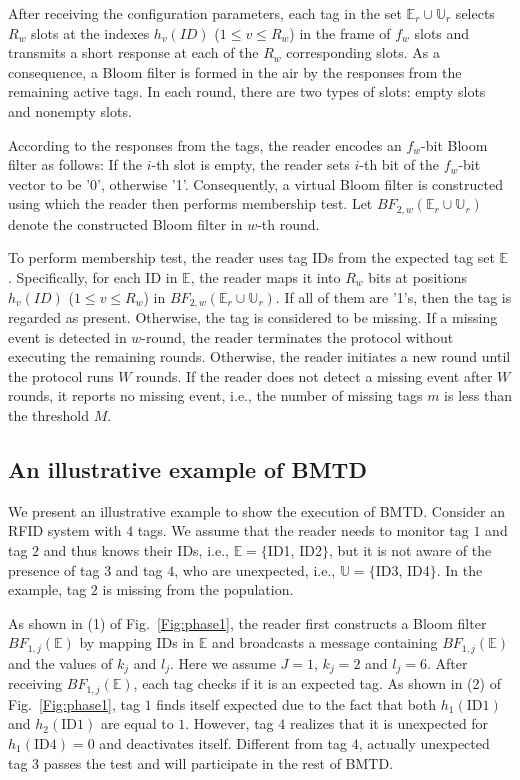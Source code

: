 \documentclass[10pt, twocolumn]{IEEEtran}
\begin{document}
After receiving the configuration parameters, each tag in the set $\mathbb{E}_r \cup \mathbb{U}_{r}$ selects $R_w$ slots at the indexes $h_v(ID)$ ($1 \le v \le R_w$) in the frame of $f_w$ slots and transmits a short response at each of the $R_w$ corresponding slots. As a consequence, a Bloom filter is formed in the air by the responses from the remaining active tags. In each round, there are two types of slots: empty slots and nonempty slots.

According to the responses from the tags, the reader encodes an $f_w$-bit Bloom filter as follows: If the $i$-th slot is empty, the reader sets $i$-th bit of the $f_w$-bit vector to be '0', otherwise '1'. Consequently, a virtual Bloom filter is constructed using which the reader then performs membership test. Let $BF_{2,w}(\mathbb{E}_r \cup \mathbb{U}_{r})$ denote the constructed Bloom filter in $w$-th round.

To perform membership test, the reader uses tag IDs from the expected tag set $\mathbb{E}$. Specifically, for each ID in $\mathbb{E}$, the reader maps it into $R_w$ bits at positions $h_v(ID)$ ($1 \le v \le R_w$) in $BF_{2,w}(\mathbb{E}_r \cup \mathbb{U}_{r})$. If all of them are '1's, then the tag is regarded as present. Otherwise, the tag is considered to be missing. If a missing event is detected in $w$-round, the reader terminates the protocol without executing the remaining rounds. Otherwise, the reader initiates a new round until the protocol runs $W$ rounds. If the reader does not detect a missing event after $W$ rounds, it reports no missing event, i.e., the number of missing tags $m$ is less than the threshold $M$.


\subsection{An illustrative example of BMTD}
We present an illustrative example to show the execution of BMTD. Consider an RFID system with $4$ tags. We assume that the reader needs to monitor tag $1$ and tag $2$ and thus knows their IDs, i.e., $\mathbb{E}$$=$$\{$ID1, ID2$\}$, but it is not aware of the presence of tag $3$ and tag $4$, who are unexpected, i.e., $\mathbb{U}$$=$$\{$ID3, ID4$\}$. In the example, tag $2$ is missing from the population.

As shown in (1) of Fig.~\ref{Fig:phase1}, the reader first constructs a Bloom filter $BF_{1,j} (\mathbb{E})$ by mapping IDs in $\mathbb{E}$ and broadcasts a message containing $BF_{1,j} (\mathbb{E})$ and the values of $k_j$ and $l_j$. Here we assume $J=1$, $k_j=2$ and $l_j=6$. After receiving $BF_{1,j} (\mathbb{E})$, each tag checks if it is an expected tag. As shown in (2) of Fig.~\ref{Fig:phase1}, tag $1$ finds itself expected due to the fact that both $h_1(\text{ID}1)$ and $h_2(\text{ID}1)$ are equal to $1$. However, tag $4$ realizes that it is unexpected for $h_1(\text{ID}4)=0$ and deactivates itself. Different from tag $4$, actually unexpected tag $3$ passes the test and will participate in the rest of BMTD.
\end{document}
